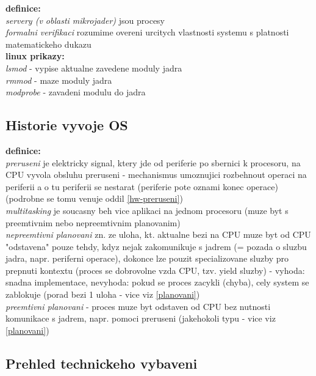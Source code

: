 \documentclass[a4paper, 11pt]{article}
\begin{document}
\noindent\textbf{definice:} \\[0.5em]
\textit{servery (v oblasti mikrojader)} jsou procesy \\[0.2em]
\textit{formalni verifikaci} rozumime overeni urcitych vlastnosti systemu s platnosti matematickeho dukazu \\[0.5em]

\noindent\textbf{linux prikazy:} \\[0.5em]
\textit{lsmod} - vypise aktualne zavedene moduly jadra \\[0.2em]
\textit{rmmod} - maze moduly jadra \\[0.2em]
\textit{modprobe} - zavadeni modulu do jadra \\[0.2em]

\newpage

\subsection{Historie vyvoje OS}

\noindent\textbf{definice:} \\[0.5em] \label{hist-preruseni} \label{ne-preemtive}
\textit{preruseni} je elektricky signal, ktery jde od periferie po sbernici k procesoru, na CPU vyvola obsluhu preruseni - mechanismus umoznujici rozbehnout operaci na periferii a o tu periferii se nestarat (periferie pote oznami konec operace) (podrobne se tomu venuje oddil \ref{hw-preruseni}) \\[0.2em]
\textit{multitasking} je soucasny beh vice aplikaci na jednom procesoru (muze byt s preemtivnim nebo nepreemtivnim planovanim) \\[0.2em]
\textit{nepreemtivni planovani} zn. ze uloha, kt. aktualne bezi na CPU muze byt od CPU "odstavena" pouze tehdy, kdyz nejak zakomunikuje s jadrem (= pozada o sluzbu jadra, napr. periferni operace), dokonce lze pouzit specializovane sluzby pro prepnuti kontextu (proces se dobrovolne vzda CPU, tzv. yield sluzby) - vyhoda: snadna implementace, nevyhoda: pokud se proces zacykli (chyba), cely system se zablokuje (porad bezi 1 uloha - vice viz \ref{planovani}) \\[0.2em]
\textit{preemtivni planovani} - proces muze byt odstaven od CPU bez nutnosti komunikace s jadrem, napr. pomoci preruseni (jakehokoli typu - vice viz \ref{planovani}) \\[1em]

\subsection{Prehled technickeho vybaveni}
\end{document}
